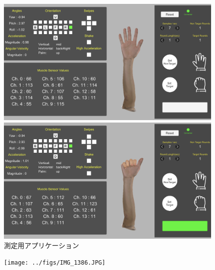 \documentclass{ltjsreport}
\begin{document}
		\begin{figure}[H]
		\centering
		\begin{minipage}{0.75\columnwidth}
		\centering
		\includegraphics[width = \columnwidth]{../figs/IMG_1866.PNG}
		\end{minipage}
		\hspace{0.04\columnwidth}
		\begin{minipage}{0.75\columnwidth}
		\centering
		\includegraphics[width = \columnwidth]{../figs/IMG_1867.PNG}
		\end{minipage}
		\caption{測定用アプリケーション}
		\end{figure}

		\begin{figure}[H]
		\centering
		\texttt{[image: ../figs/IMG\_1386.JPG]}
		\caption{}
		\label{}
		\end{figure}
\end{document}
